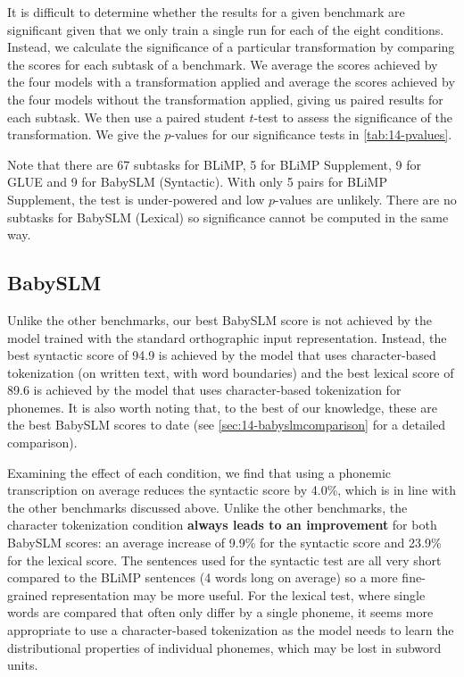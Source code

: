 It is difficult to determine whether the results for a given benchmark are significant given that we only train a single run for each of the eight conditions. Instead, we calculate the significance of a particular transformation by comparing the scores for each subtask of a benchmark. We average the scores achieved by the four models with a transformation applied and average the scores achieved by the four models without the transformation applied, giving us paired results for each subtask. We then use a paired student $t$-test to assess the significance of the transformation. We give the $p$-values for our significance tests in \cref{tab:14-pvalues}.

Note that there are 67 subtasks for BLiMP, 5 for BLiMP Supplement, 9 for GLUE and 9 for BabySLM (Syntactic). With only 5 pairs for BLiMP Supplement, 
the test is under-powered and low $p$-values are unlikely. There are no subtasks for BabySLM (Lexical) so significance cannot be computed in the same way. 





\subsection{BabySLM}
\label{sec:14-babyslm}

Unlike the other benchmarks, our best BabySLM score is not achieved by the model trained with the standard orthographic input representation. Instead, the best syntactic score of 94.9 is achieved by the model that uses character-based tokenization (on written text, with word boundaries) and the best lexical score of 89.6 is achieved by the model that uses character-based tokenization for phonemes. It is also worth noting that, to the best of our knowledge, these are the best BabySLM scores to date (see \cref{sec:14-babyslmcomparison} for a detailed comparison).

Examining the effect of each condition, we find that using a phonemic transcription on average reduces the syntactic score by 4.0\%, which is in line with the other benchmarks discussed above. Unlike the other benchmarks, the character tokenization condition \textbf{always leads to an improvement} for both BabySLM scores: an average increase of 9.9\% for the syntactic score and 23.9\% for the lexical score. The sentences used for the syntactic test are all very short compared to the BLiMP sentences (4 words long on average) so a more fine-grained representation may be more useful. For the lexical test, where single words are compared that often only differ by a single phoneme, it seems more appropriate to use a character-based tokenization as the model needs to learn the distributional properties of individual phonemes, which may be lost in subword units. 

